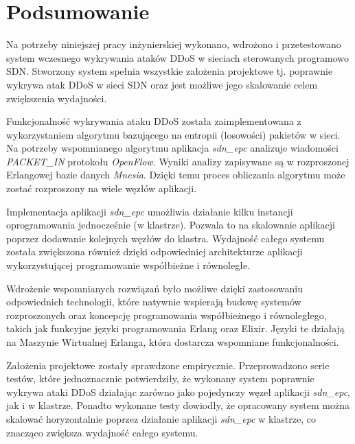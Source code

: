 \chapter{Podsumowanie}

Na potrzeby niniejszej pracy inżynierskiej wykonano, wdrożono i przetestowano
system wczesnego wykrywania ataków DDoS w sieciach sterowanych programowo SDN.
Stworzony system spełnia wszystkie założenia projektowe tj. poprawnie wykrywa
atak DDoS w sieci SDN oraz jest możliwe jego skalowanie celem zwiększenia
wydajności.

Funkcjonalność wykrywania ataku DDoS została zaimplementowana z wykorzystaniem
algorytmu bazującego na entropii (losowości) pakietów w sieci. Na potrzeby
wspomnianego algorytmu aplikacja \textit{sdn\_epc} analizuje wiadomości
\mbox{\textit{PACKET\_IN}} protokołu \textit{OpenFlow}. Wyniki analizy
zapisywane są w rozproszonej Erlangowej bazie danych \textit{Mnesia}. Dzięki
temu proces obliczania algorytmu może zostać rozproszony na wiele węzłów
aplikacji.

Implementacja aplikacji \textit{sdn\_epc} umożliwia działanie kilku instancji
oprogramowania jednocześnie (w klastrze). Pozwala to na skalowanie aplikacji
poprzez dodawanie kolejnych węzłów do klastra. Wydajność całego systemu została
zwiększona również dzięki odpowiedniej architekturze aplikacji wykorzystującej
programowanie współbieżne i równoległe.

Wdrożenie wspomnianych rozwiązań było możliwe dzięki zastosowaniu odpowiednich
technologii, które natywnie wspierają budowę systemów rozproszonych oraz
koncepcję programowania współbieżnego i równoległego, takich jak funkcyjne
języki programowania Erlang oraz Elixir. Języki te działają na Maszynie
Wirtualnej Erlanga, która dostarcza wspomniane funkcjonalności.

Założenia projektowe zostały sprawdzone empirycznie. Przeprowadzono serie
testów, które jednoznacznie potwierdziły, że wykonany system poprawnie wykrywa
ataki DDoS działając zarówno jako pojedynczy węzeł aplikacji \textit{sdn\_epc},
jak i w klastrze. Ponadto wykonane testy dowiodły, że opracowany system można
skalować horyzontalnie poprzez działanie aplikacji \textit{sdn\_epc} w klastrze,
co znacząco zwiększa wydajność całego systemu.